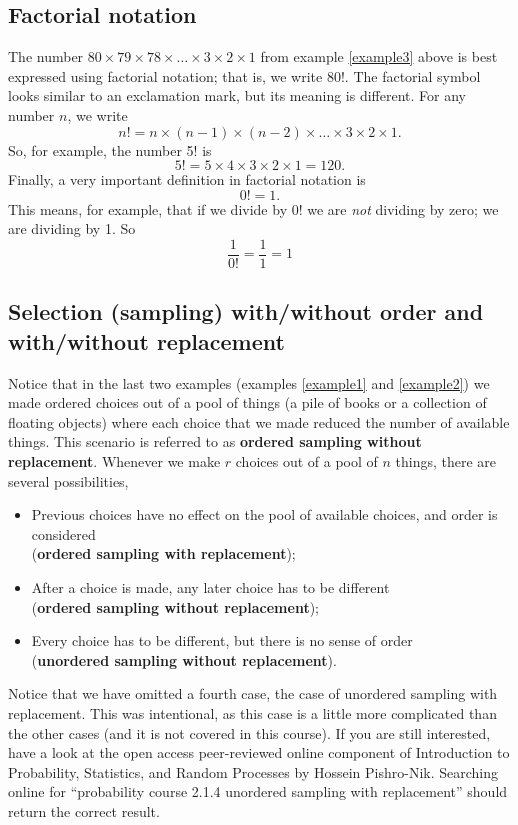 \subsection{Factorial notation}
The number $80\times79\times78\times\ldots\times 3\times2 \times1$ from example \ref{example3} above is best expressed using factorial notation; that is, we write $80!.$ The factorial symbol looks similar to an exclamation mark, but its meaning is different. For any number $n$, we write \label{!} \label{factorial}
\[
n! = n\times (n-1) \times (n-2) \times \ldots \times 3 \times 2 \times 1.
\]
So, for example, the number 5! is
\[
5! = 5\times 4 \times 3 \times 2 \times 1 = 120.
\]
Finally, a very important definition in factorial notation is
\[
0! = 1.
\]
This means, for example, that if we divide by $0!$ we are \textit{not} dividing by zero; we are dividing by 1. So
\[
\frac{1}{0!} = \frac{1}{1} = 1
\]


\subsection{Selection (sampling) with/without order and with/without replacement} \label{ordered sampling}
Notice that in the last two examples (examples \ref{example1} and \ref{example2}) we made ordered choices out of a pool of things (a pile of books or a collection of floating objects) where each choice that we made reduced the number of available things. This scenario is referred to as \textbf{ordered sampling without replacement}. Whenever we make $r$ choices out of a pool of $n$ things, there are several possibilities, \label{sampling}
\begin{itemize}
\item
Previous choices have no effect on the pool of available choices, and order is considered \\ (\textbf{ordered sampling with replacement});
\item
After a choice is made, any later choice has to be different \\ (\textbf{ordered sampling without replacement});
\item
Every choice has to be different, but there is no sense of order \\ (\textbf{unordered sampling without replacement}).
\end{itemize}
Notice that we have omitted a fourth case, the case of unordered sampling with replacement. This was intentional, as this case is a little more complicated than the other cases (and it is not covered in this course). If you are still interested, have a look at the open access peer-reviewed online component of Introduction to Probability, Statistics, and Random Processes by Hossein Pishro-Nik. Searching online for ``probability course 2.1.4 unordered sampling with replacement'' should return the correct result.

